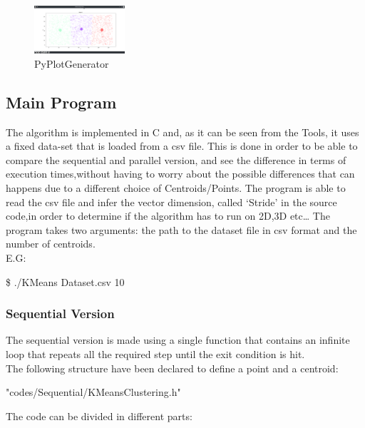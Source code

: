 \documentclass[10pt,twocolumn,letterpaper]{article}
\newenvironment{Shaded}{}{}
\newcommand{\ExtensionTok}[1]{#1}
\newcommand{\NormalTok}[1]{#1}
\begin{document}
\begin{figure}[H]
\centering
\includegraphics[width=0.3\textwidth]{Py_Plot_Generator}
\caption{PyPlotGenerator}
\end{figure}


\subsection{Main Program}
The algorithm is implemented in C and, as it can be seen from the Tools, it uses a fixed data-set that is loaded from a csv file.
\newline
This is done in order to be able to compare the sequential and parallel version, and see the difference in terms of execution 
times,without having to worry about the possible differences that can happens due to a different choice of Centroids/Points.
\newline
The program is able to read the csv file and infer the vector dimension, called `Stride' in the source code,in order to 
determine if the algorithm has to run on 2D,3D etc\ldots \newline
The program takes two arguments: the path to the dataset file in csv format and the number of centroids.\\
E.G:
\begin{Shaded}
\begin{Highlighting}[]
\NormalTok{\$ }\ExtensionTok{./KMeans} \NormalTok{ Dataset.csv 10}
\end{Highlighting}
\end{Shaded}
\subsubsection{Sequential Version}
The sequential version is made using a single function that contains an infinite loop that repeats all the required step until the exit
condition is hit.\\
The following structure have been declared to define a point and a centroid:
\begin{lstinputlisting}[language=C,style=CSnippetStyle,caption=Data Structure Definition ]{
	"codes/Sequential/KMeansClustering.h"}
\end{lstinputlisting}
The code can be divided in different parts:\\
\end{document}
